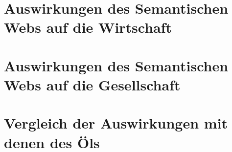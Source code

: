 \section{Auswirkungen des Semantischen Webs auf die Wirtschaft}

\subsection{}

\section{Auswirkungen des Semantischen Webs auf die Gesellschaft}

\subsection{}

\section{Vergleich der Auswirkungen mit denen des Öls}

\subsection{}
